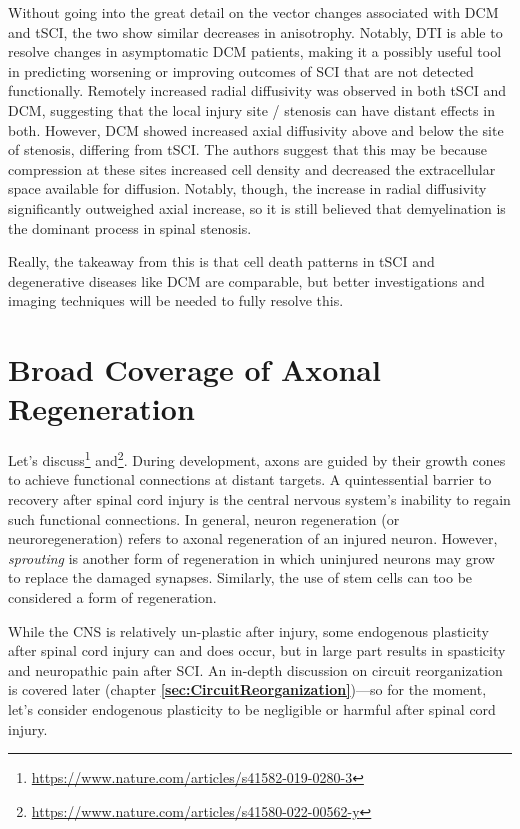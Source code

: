 Without going into the great detail on the vector changes associated with DCM and tSCI, the two show similar decreases in anisotrophy. Notably, DTI is able to resolve changes in asymptomatic DCM patients, making it a possibly useful tool in predicting worsening or improving outcomes of SCI that are not detected functionally. Remotely increased radial diffusivity was observed in both tSCI and DCM, suggesting that the local injury site / stenosis can have distant effects in both. However, DCM showed increased axial diffusivity above and below the site of stenosis, differing from tSCI. The authors suggest that this may be because compression at these sites increased cell density and decreased the extracellular space available for diffusion. Notably, though, the increase in radial diffusivity significantly outweighed axial increase, so it is still believed that demyelination is the dominant process in spinal stenosis.\newline

Really, the takeaway from this is that cell death patterns in tSCI and degenerative diseases like DCM are comparable, but better investigations and imaging techniques will be needed to fully resolve this. 







\chapter{Broad Coverage of Axonal Regeneration}

\label{sec:TranslationalLandscape}

Let's discuss\footnote{\url{https://www.nature.com/articles/s41582-019-0280-3}} and\footnote{\url{https://www.nature.com/articles/s41580-022-00562-y}}. During development, axons are guided by their growth cones to achieve functional connections at distant targets. A quintessential barrier to recovery after spinal cord injury is the central nervous system's inability to regain such functional connections. In general, neuron regeneration (or neuroregeneration) refers to axonal regeneration of an injured neuron. However, \textit{sprouting} is another form of regeneration in which uninjured neurons may grow to replace the damaged synapses. Similarly, the use of stem cells can too be considered a form of regeneration. \newline

While the CNS is relatively un-plastic after injury, some endogenous plasticity after spinal cord injury can and does occur, but in large part results in spasticity and neuropathic pain after SCI. An in-depth discussion on circuit reorganization is covered later (chapter \textbf{\ref{sec:CircuitReorganization}})---so for the moment, let's consider endogenous plasticity to be negligible or harmful after spinal cord injury.\newline

